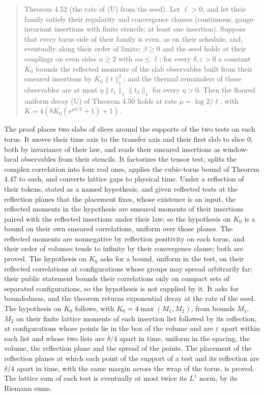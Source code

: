 \documentclass[10pt,letterpaper,twocolumn]{article}
\begin{document}
\begin{quote}
Theorem 4.52 (the rate of (U) from the seed). Let \(\ell>0\), and let their family satisfy their regularity and convergence clauses (continuous, gauge-invariant insertions with finite stencils; at least one insertion). Suppose that every torus side of their family is even, as on their schedule, and, eventually along their order of limits: \(\beta\ge0\) and the seed holds at their couplings on even sides \(n\ge2\) with \(na\le\ell\); for every \(\delta,\varepsilon>0\) a constant \(K_0\) bounds the reflected moments of the slab observables built from their smeared insertions by \(K_0\lVert t\rVert_1^2\); and the thermal remainders of those observables are at most \(\eta\lVert t_1\rVert_1\lVert t_2\rVert_1\) for every \(\eta>0\). Then the floored uniform decay (U) of Theorem 4.50 holds at rate \(\mu=\log2/\ell\), with \(K=4(8K_0(e^{\mu\delta/2}+1)+1)\).
\end{quote}

The proof places two slabs of slices around the supports of the two tests on each torus. It moves their time axis to the transfer axis and their first slab to slice \(0\), both by invariance of their law, and reads their smeared insertions as window-local observables from their stencils. It factorizes the tensor test, splits the complex correlation into four real ones, applies the cubic-torus bound of Theorem 4.47 to each, and converts lattice gaps to physical time. Under a reflection of their tokens, stated as a named hypothesis, and given reflected tests at the reflection planes that the placement fixes, whose existence is an input, the reflected moments in the hypothesis are smeared moments of their insertions paired with the reflected insertions under their law; so the hypothesis on \(K_0\) is a bound on their own smeared correlations, uniform over those planes. The reflected moments are nonnegative by reflection positivity on each torus, and their order of volumes tends to infinity by their convergence clause; both are proved. The hypothesis on \(K_0\) asks for a bound, uniform in the test, on their reflected correlations at configurations whose groups may spread arbitrarily far; their public statement bounds their correlations only on compact sets of separated configurations, so the hypothesis is not supplied by it. It asks for boundedness, and the theorem returns exponential decay at the rate of the seed. The hypothesis on \(K_0\) follows, with \(K_0=4\max(M_1,M_2)\), from bounds \(M_1\), \(M_2\) on their finite lattice moments of each insertion list followed by its reflection, at configurations whose points lie in the box of the volume and are \(\varepsilon\) apart within each list and whose two lists are \(\delta/4\) apart in time, uniform in the spacing, the volume, the reflection plane and the spread of the points. The placement of the reflection planes at which each point of the support of a test and its reflection are \(\delta/4\) apart in time, with the same margin across the wrap of the torus, is proved. The lattice sum of each test is eventually at most twice its \(L^1\) norm, by its Riemann sums.
\end{document}
